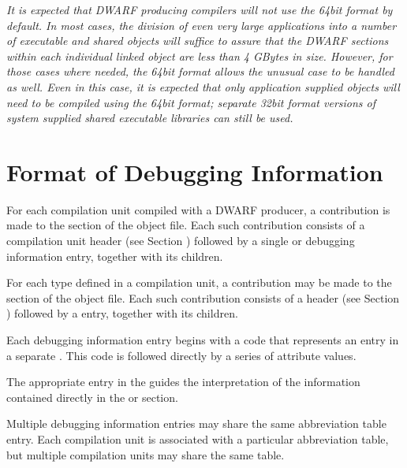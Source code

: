 \textit{It is expected that DWARF producing compilers will \emph{not} use
the 64\dash bit format \emph{by default}. In most cases, the division of
even very large applications into a number of executable and
shared objects will suffice to assure that the DWARF sections
within each individual linked object are less than 4 GBytes
in size. However, for those cases where needed, the 64\dash bit
format allows the unusual case to be handled as well. Even
in this case, it is expected that only application supplied
objects will need to be compiled using the 64\dash bit format;
separate 32\dash bit format versions of system supplied shared
executable libraries can still be used.}



\section{Format of Debugging Information}
\label{datarep:formatofdebugginginformation}

For each compilation unit compiled with a DWARF producer,
a contribution is made to the \dotdebuginfo{} section of
the object file. Each such contribution consists of a
compilation unit header 
(see Section ) 
followed by a
single  or 
 debugging
information entry, together with its children.

For each type defined in a compilation unit, a contribution may
be made to the \dotdebugtypes{} 
section of the object file. Each
such contribution consists of a 
 header 
(see Section ) 
followed by a  entry, together with
its children.

Each debugging information entry begins with a code that
represents an entry in a separate 
. This
code is followed directly by a series of attribute values.

The appropriate entry in the 
 guides the
interpretation of the information contained directly in the
\dotdebuginfo{} or 
\dotdebugtypes{} section.

Multiple debugging information entries may share the same
abbreviation table entry. Each compilation unit is associated
with a particular abbreviation table, but multiple compilation
units may share the same table.
